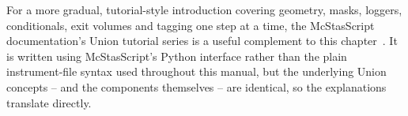 For a more gradual, tutorial-style introduction covering geometry, masks,
loggers, conditionals, exit volumes and tagging one step at a time, the
McStasScript documentation's Union tutorial series is a useful complement
to this chapter~\cite{mcstasscript_union_tutorial}. It is written using
McStasScript's Python interface rather than the plain \MCS instrument-file
syntax used throughout this manual, but the underlying Union concepts --
and the components themselves -- are identical, so the explanations
translate directly.

